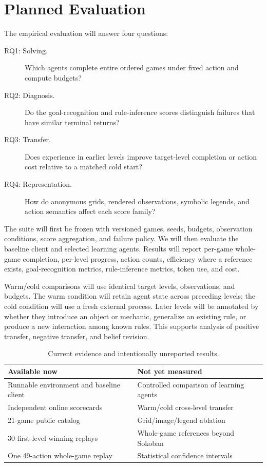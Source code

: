 \documentclass[sigconf,nonacm]{acmart}
\begin{document}
\section{Planned Evaluation}

The empirical evaluation will answer four questions:

\begin{description}
  \item[RQ1: Solving.] Which agents complete entire ordered games under fixed
  action and compute budgets?
  \item[RQ2: Diagnosis.] Do the goal-recognition and rule-inference scores
  distinguish failures that have similar terminal returns?
  \item[RQ3: Transfer.] Does experience in earlier levels improve target-level
  completion or action cost relative to a matched cold start?
  \item[RQ4: Representation.] How do anonymous grids, rendered observations,
  symbolic legends, and action semantics affect each score family?
\end{description}

The suite will first be frozen with versioned games, seeds, budgets, observation
conditions, score aggregation, and failure policy. We will then evaluate the
baseline client and selected learning agents. Results will report per-game
whole-game completion, per-level progress, action counts, efficiency where a
reference exists, goal-recognition metrics, rule-inference metrics, token use,
and cost.

Warm/cold comparisons will use identical target levels, observations, and
budgets. The warm condition will retain agent state across preceding levels;
the cold condition will use a fresh external process. Later levels will be
annotated by whether they introduce an object or mechanic, generalize an
existing rule, or produce a new interaction among known rules. This supports
analysis of positive transfer, negative transfer, and belief revision.

\begin{table}[t]
  \caption{Current evidence and intentionally unreported results.}
  \label{tab:status}
  \centering
  \small
  \begin{tabular}{p{}p{}}
    \toprule
    Available now & Not yet measured \\
    \midrule
    Runnable environment and baseline client &
    Controlled comparison of learning agents \\
    Independent online scorecards &
    Warm/cold cross-level transfer \\
    21-game public catalog &
    Grid/image/legend ablation \\
    30 first-level winning replays &
    Whole-game references beyond Sokoban \\
    One 49-action whole-game replay &
    Statistical confidence intervals \\
    \bottomrule
  \end{tabular}
\end{table}
\end{document}
